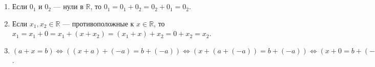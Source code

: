 \documentclass{article}
\begin{document}
\section{\centering}
\noindent{}
\begin{enumerate}[leftmargin=*]
    \item Если \(0_1\) и \(0_2\) --- нули в \(\mathbb{R}\), то \(0_1 = 0_1 + 0_2 = 0_2 + 0_1 = 0_2\).  
    \item Если \(x_1, x_2 \in \mathbb{R}\) --- противоположные к \(x \in \mathbb{R}\), то \(x_1 = x_1 + 0 = x_1 + (x + x_2) = (x_1 + x) + x_2 = 0 + x_2 = x_2\). 
    \item \((a + x = b) \iff ((x + a) + (-a) = b + (-a)) \iff (x + (a + (-a)) = b + (-a)) \iff (x + 0 = b + (-a)) \iff (x = b + (-a))\).
\end{enumerate}

\end{document}
